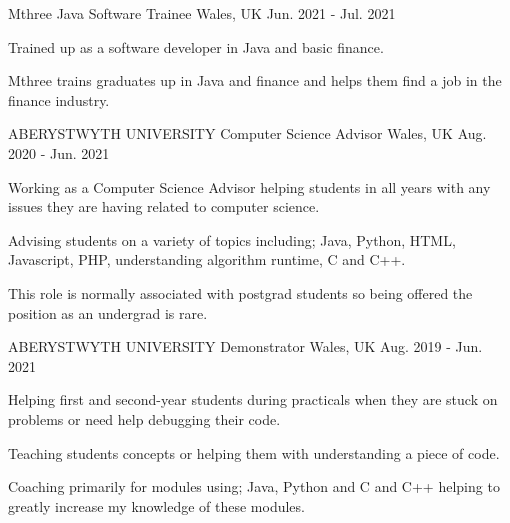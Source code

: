 

\begin{cventries}

\cventry
    {Mthree} %
    {Java Software Trainee} %
    {Wales, UK} %
    {Jun. 2021 - Jul. 2021} %
    {
      \begin{cvitems} %
        \item {Trained up as a software developer in Java and basic finance.}
        \item {Mthree trains graduates up in Java and finance and helps them find a job in the finance industry.}
      \end{cvitems}
    }

  \cventry
    {ABERYSTWYTH UNIVERSITY} %
    {Computer Science Advisor} %
    {Wales, UK} %
    {Aug. 2020 - Jun. 2021} %
    {
      \begin{cvitems} %
        \item {Working as a Computer Science Advisor helping students in all years with any issues they are having related to computer science.}
        \item {Advising students on a variety of topics including; Java, Python, HTML, Javascript, PHP, understanding algorithm runtime, C and C++.}
        \item {This role is normally associated with postgrad students so being offered the position as an undergrad is rare.}
      \end{cvitems}
    }

  \cventry
    {ABERYSTWYTH UNIVERSITY} %
    {Demonstrator} %
    {Wales, UK} %
    {Aug. 2019 - Jun. 2021} %
    {
      \begin{cvitems} %
        \item {Helping first and second-year students during practicals when they are stuck on problems or need help debugging their code.}
        \item {Teaching students concepts or helping them with understanding a piece of code.}
        \item {Coaching primarily for modules using; Java, Python and C and C++ helping to greatly increase my knowledge of these modules.}
      \end{cvitems}
    }


\end{cventries}
